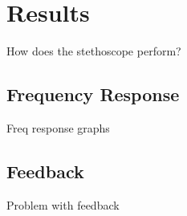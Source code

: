 \chapter{Results} \label{results}

How does the stethoscope perform?

\section{Frequency Response}
Freq response graphs

\section{Feedback}
Problem with feedback